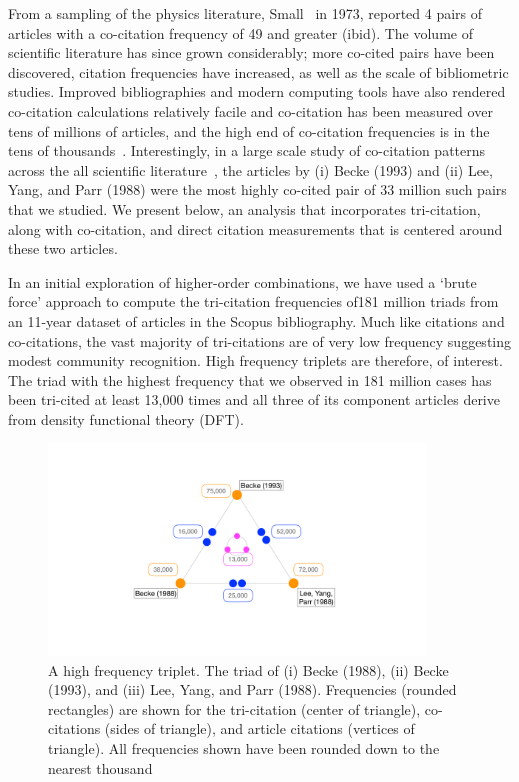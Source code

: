 \documentclass[11pt, oneside]{article}   	%
\begin{document}
From a sampling of the physics literature, Small~\citep{Small1973} in 1973, reported 4 pairs of articles with a co-citation frequency of 49 and greater (ibid). The volume of scientific literature has since grown considerably; more co-cited pairs have been discovered, citation frequencies have increased, as well as the scale of bibliometric studies. Improved bibliographies and modern computing tools have also rendered co-citation calculations relatively facile and co-citation has been measured over tens of millions of articles, and the high end of co-citation frequencies is in the tens of thousands~\citep{Stringer2010,Uzzi2013,devarakonda_2020}. Interestingly, in a large scale study of co-citation patterns across the all scientific literature~\citep{devarakonda_2020}, the articles by (i) Becke (1993)\citep{becke1993dft} and (ii) Lee, Yang, and Parr (1988)\citep{lyp1988} were the most highly co-cited pair of 33 million such pairs that we studied. We present below, an analysis that incorporates tri-citation, along with co-citation, and direct citation measurements that is centered around these two articles. 


In an initial exploration of higher-order combinations, we have used a `brute force' approach to compute the tri-citation frequencies of181 million triads from an 11-year dataset of articles in the Scopus bibliography.  Much like citations and co-citations, the vast majority of tri-citations are of very low frequency suggesting modest community recognition. High frequency triplets are therefore, of interest. The triad with the highest frequency that we observed in 181 million cases has been tri-cited at least 13,000 times and all three of its component articles derive from density functional theory (DFT). 
\begin{figure}[h!]
\begin{center}
\includegraphics[width=10cm]{fig1_tricite.pdf}%
\end{center}
\caption{A high frequency triplet. The triad of (i) Becke (1988), (ii) Becke (1993), and (iii) Lee, Yang, and Parr (1988).  Frequencies (rounded rectangles) are shown for the tri-citation (center of triangle), co-citations (sides of triangle), and article citations (vertices of triangle). All frequencies shown have been rounded down to the nearest thousand
}
\label{fig:fig1}
\end{figure}
\end{document}
